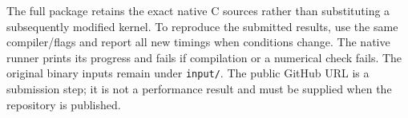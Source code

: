 \documentclass[10pt,a4paper]{article}
\begin{document}
The full package retains the exact native C sources rather than substituting a subsequently
modified kernel. To reproduce the submitted results, use the same compiler/flags and report
all new timings when conditions change. The native runner prints its progress and fails if
compilation or a numerical check fails. The original binary inputs remain under \texttt{input/}.
The public GitHub URL is a submission step; it is not a performance result and must be supplied
when the repository is published.
\end{document}
